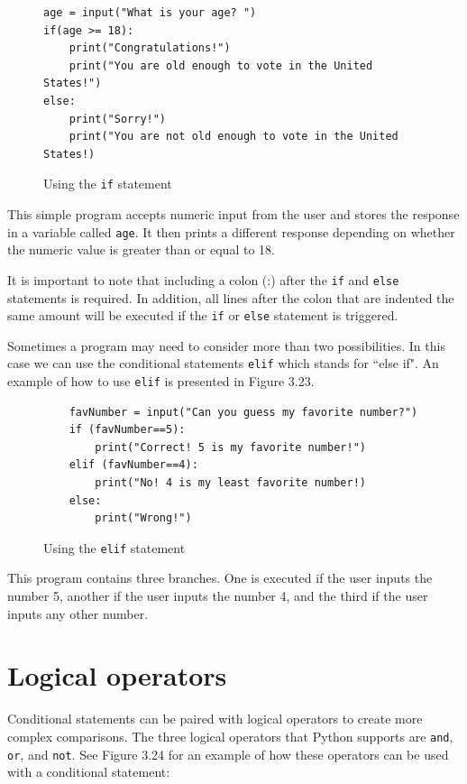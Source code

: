 \documentclass{book}
\begin{document}
\begin{figure}[h]
	\caption{Using the \texttt{if} statement}
\begin{lstlisting}
age = input("What is your age? ")
if(age >= 18):
	print("Congratulations!")
	print("You are old enough to vote in the United States!")
else:
	print("Sorry!")
	print("You are not old enough to vote in the United States!)
\end{lstlisting}
\end{figure}

This simple program accepts numeric input from the user and stores the response in a variable called \texttt{age}. It then prints a different response depending on whether the numeric value is greater than or equal to 18. 

It is important to note that including a colon (:) after the \texttt{if} and \texttt{else} statements is required. In addition, all lines after the colon that are indented the same amount will be executed if the \texttt{if} or \texttt{else} statement is triggered.

Sometimes a program may need to consider more than two possibilities. In this case we can use the conditional statements \texttt{elif} which stands for ``else if". An example of how to use \texttt{elif} is presented in Figure 3.23.

\begin{figure}[h]
	\caption{Using the \texttt{elif} statement}
	\begin{lstlisting}
	favNumber = input("Can you guess my favorite number?")
	if (favNumber==5):
		print("Correct! 5 is my favorite number!")
	elif (favNumber==4):
		print("No! 4 is my least favorite number!)
	else:
		print("Wrong!")
	\end{lstlisting}
\end{figure}

This program contains three branches. One is executed if the user inputs the number 5, another if the user inputs the number 4, and the third if the user inputs any other number.

\section{Logical operators}

Conditional statements can be paired with logical operators to create more complex comparisons. The three logical operators that Python supports are \texttt{and}, \texttt{or}, and \texttt{not}. See Figure 3.24 for an example of how these operators can be used with a conditional statement:
\end{document}
